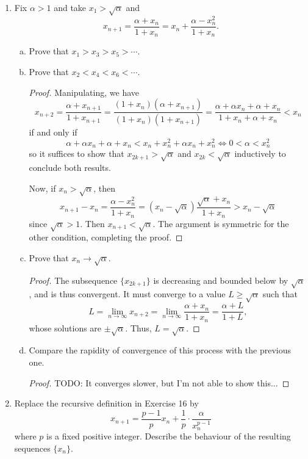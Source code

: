 \begin{enumerate}
\item %
Fix $\alpha > 1$ and take $x_1 > \sqrt{\alpha}$ and
\[
	x_{n+1} = \frac{\alpha + x_n}{1 + x_n} = x_n + \frac{\alpha - x_n^2}{1 + x_n}.
\]
\begin{enumerate}[(a)]
\item Prove that $x_1 > x_3 > x_5 > \dotsb$.
\item Prove that $x_2 < x_4 < x_6 < \dotsb$.
\begin{proof}
    Manipulating, we have
    \[
        x_{n+2} = \frac{\alpha + x_{n+1}}{1 + x_{n+1}} = \frac{(1 + x_n)(\alpha + x_{n+1})}{(1 + x_n)(1 + x_{n+1})} = \frac{\alpha + \alpha x_n + \alpha + x_n}{1 + x_n + \alpha + x_n} < x_n
    \]
    if and only if
    \[
        \alpha + \alpha x_n + \alpha + x_n < x_n + x_n^2 + \alpha x_n + x_n^2 \iff 0 < \alpha < x_n^2
    \]
    so it suffices to show that $x_{2k+1} > \sqrt{\alpha}$ and $x_{2k} < \sqrt{\alpha}$ inductively to conclude both results.

    Now, if $x_n > \sqrt{\alpha}$, then 
    \[
        x_{n+1} - x_n = \frac{\alpha - x_n^2}{1 + x_n} = (x_n - \sqrt{\alpha}) \frac{\sqrt{\alpha} + x_n}{1 + x_n} > x_n - \sqrt{\alpha}
    \]
    since $\sqrt{\alpha} > 1$. Then $x_{n+1} < \sqrt{\alpha}$. The argument is symmetric for the other condition, completing the proof.
\end{proof}

\item Prove that $x_n \to \sqrt{\alpha}$.
    \begin{proof}
        The subsequence $\{x_{2k+1}\}$ is decreasing and bounded below by $\sqrt{\alpha}$, and is thus convergent. It must converge to a value $L \ge \sqrt{\alpha}$ such that
        \[
            L = \lim_{n \to \infty} x_{n+2} = \lim_{n \to \infty} \frac{\alpha + x_n}{1 + x_n} = \frac{\alpha + L}{1 + L},
        \]
        whose solutions are $\pm \sqrt{\alpha}$. Thus, $L = \sqrt{\alpha}$.
    \end{proof}
\item Compare the rapidity of convergence of this process with the previous one.

\begin{proof}
    TODO: It converges slower, but I'm not able to show this...
\end{proof}
\end{enumerate}

\item %
Replace the recursive definition in Exercise 16 by
\[
	x_{n+1} = \frac{p-1}{p} x_n + \frac{1}{p} \cdot \frac{\alpha}{x_n^{p-1}}
\]
where $p$ is a fixed positive integer. Describe the behaviour of the resulting sequences $\{x_n\}$. 


\end{enumerate}
